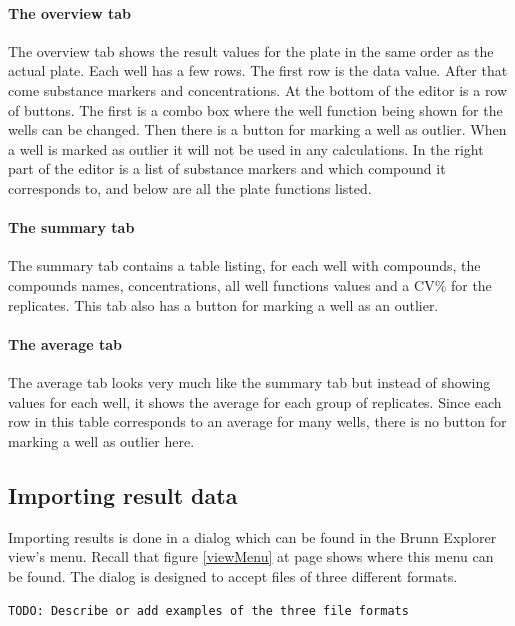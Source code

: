 \documentclass[a4paper,10pt]{article}
\begin{document}
                \paragraph{The overview tab}
                    The overview tab shows the result values for the plate in
                    the same order as the actual plate. Each well has a few
                    rows. The first row is the data value. After that come
                    substance markers and concentrations. At the bottom of the
                    editor is a row of buttons. The first is a combo box where
                    the well function being shown for the wells can be
                    changed. Then there is a button for marking a well as
                    outlier. When a well is marked as outlier it will not be
                    used in any calculations. In the right part of the editor
                    is a list of substance markers and which compound it
                    corresponds to, and below are all the plate functions
                    listed.

                \paragraph{The summary tab}
                    The summary tab contains a table listing, for each well
                    with compounds, the compounds names, concentrations, all
                    well functions values and a CV\% for the replicates. This
                    tab also has a button for marking a well as an outlier. 

                \paragraph{The average tab}
                    The average tab looks very much like the summary tab but
                    instead of showing values for each well, it shows the average
                    for each group of replicates. Since each row in this table
                    corresponds to an average for many wells, there is no button
                    for marking a well as outlier here.

        \subsection{Importing result data}
        \label{importingResult}
            Importing results is done in a dialog which can be found in the
            Brunn Explorer view's menu. Recall that figure \ref{viewMenu} at
            page \pageref{viewMenu} shows where this menu can be found. The
            dialog is designed to accept files of three different formats.  
            
            \texttt{TODO: Describe or add examples of the three file formats}
\end{document}
